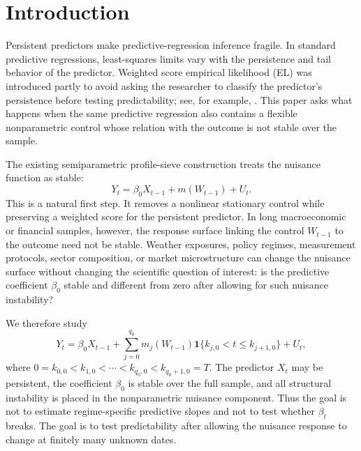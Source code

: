 \documentclass[12pt]{article} %
\numberwithin{equation}{section}
\theoremstyle{definition}
\newcommand{\ind}{\mathbf 1}
\begin{document}
\def\thefigure{\arabic{figure}}
\def\thetable{\arabic{table}}
\renewcommand{\theequation}{\thesection.\arabic{equation}}

\fontsize{12}{14pt plus.8pt minus .6pt}\selectfont

\section{Introduction}

Persistent predictors make predictive-regression inference fragile. In standard predictive regressions, least-squares limits vary with the persistence and tail behavior of the predictor. Weighted score empirical likelihood (EL) was introduced partly to avoid asking the researcher to classify the predictor's persistence before testing predictability; see, for example, \citet{ZhuCaiPeng2014}. This paper asks what happens when the same predictive regression also contains a flexible nonparametric control whose relation with the outcome is not stable over the sample.

The existing semiparametric profile-sieve construction treats the nuisance function as stable:
\[
    Y_t=\beta_0X_{t-1}+m(W_{t-1})+U_t.
\]
This is a natural first step. It removes a nonlinear stationary control while preserving a weighted score for the persistent predictor. In long macroeconomic or financial samples, however, the response surface linking the control \(W_{t-1}\) to the outcome need not be stable. Weather exposures, policy regimes, measurement protocols, sector composition, or market microstructure can change the nuisance surface without changing the scientific question of interest: is the predictive coefficient \(\beta_0\) stable and different from zero after allowing for such nuisance instability?

We therefore study
\begin{equation}
    Y_t
    =
    \beta_0X_{t-1}
    +
    \sum_{j=0}^{q_0}
    m_j(W_{t-1})
    \ind\{k_{j,0}<t\leq k_{j+1,0}\}
    +
    U_t,
    \label{eq:intro-model}
\end{equation}
where \(0=k_{0,0}<k_{1,0}<\cdots<k_{q_0,0}<k_{q_0+1,0}=T\). The predictor \(X_t\) may be persistent, the coefficient \(\beta_0\) is stable over the full sample, and all structural instability is placed in the nonparametric nuisance component. Thus the goal is not to estimate regime-specific predictive slopes and not to test whether \(\beta_t\) breaks. The goal is to test predictability after allowing the nuisance response to change at finitely many unknown dates.
\end{document}
